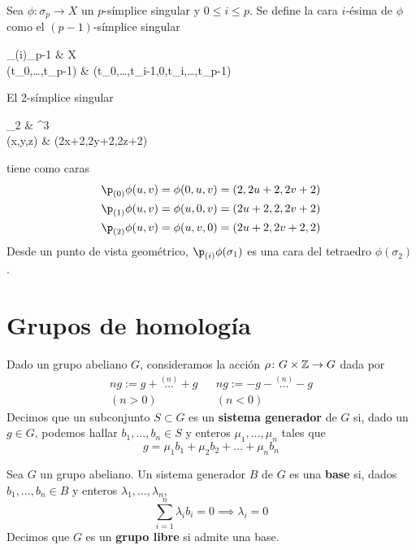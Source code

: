 Sea $\phi\colon \sigma_p \to X$ un $p$-símplice singular y $0 \leq i \leq p$.
Se define la cara $i$-ésima de $\phi$ como el $(p-1)$-símplice singular
\begin{funcion*}
	\p_{(i)}\phi\colon \sigma_{p-1} \arrow[r] & X \\
	{(t_0,\dots,t_{p-1})} \arrow[r, maps to] & \phi(t_0,\dots,t_{i-1},0,t_{i},\dots,t_{p-1})
\end{funcion*}

\begin{example}
	El 2-símplice singular
	\begin{funcion*}
		\phi\colon  \sigma_2 \arrow[r] & ^3 \\
		(x,y,z) \arrow[r, maps to] & (2x+2,2y+2,2z+2)
	\end{funcion*}
	tiene como caras
	\begin{align*}
		\p_{(0)}\phi(u,v)&=\phi(0,u,v)=(2,2u+2,2v+2)\\
		\p_{(1)}\phi(u,v)&=\phi(u,0,v)=(2u+2,2,2v+2)\\
		\p_{(2)}\phi(u,v)&=\phi(u,v,0)=(2u+2,2v+2,2)
	\end{align*}
	Desde un punto de vista geométrico, $\p_{(i)}\phi(\sigma_1)$ es una cara del tetraedro $\phi(\sigma_2)$.
\end{example}

\section{Grupos de homología}
Dado un grupo abeliano $G$, consideramos la acción $\rho\colon G\times \mathbb{Z} \to G$ dada por
\begin{align*}
	ng:=g+\stackrel{(n)}{\dots}+g	&& ng:=-g-\stackrel{(n)}{\dots}-g\\
	(n > 0)							&& (n < 0)
\end{align*}
Decimos que un subconjunto $S \subset G$ es un \textbf{sistema generador} de $G$ si, dado un $g \in G$, podemos hallar $b_1,\dots,b_n \in S$ y enteros $\mu_1,\dots,\mu_n$ tales que
\[g=\mu_1b_1+\mu_2b_2+\dots+\mu_nb_n\]

\begin{definition}
	Sea $G$ un grupo abeliano.
	Un sistema generador $B$ de $G$ es una \textbf{base} si, dados $b_1,\dots,b_n \in B$ y enteros $\lambda_1,\dots,\lambda_n$,
	\begin{equation}
		\label{SisLibre} \sum^n_{i=1}\lambda_ib_i=0 \implies \lambda_i=0
	\end{equation}
	Decimos que $G$ es un \textbf{grupo libre} si admite una base.
\end{definition}

